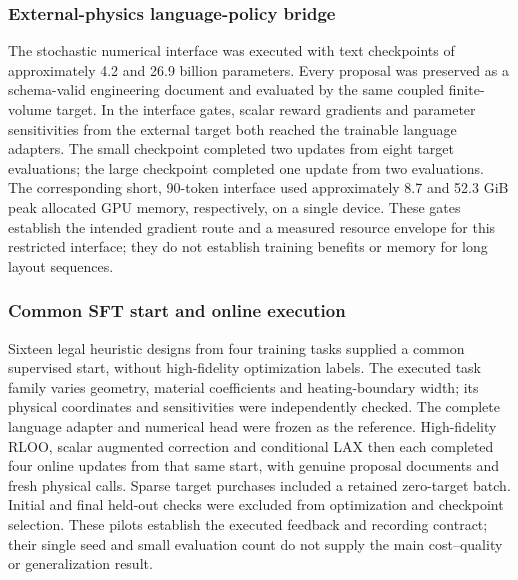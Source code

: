 \subsubsection{External-physics language-policy bridge}
The stochastic numerical interface was executed with text checkpoints of approximately 4.2 and 26.9 billion parameters. Every proposal was preserved as a schema-valid engineering document and evaluated by the same coupled finite-volume target. In the interface gates, scalar reward gradients and parameter sensitivities from the external target both reached the trainable language adapters. The small checkpoint completed two updates from eight target evaluations; the large checkpoint completed one update from two evaluations. The corresponding short, 90-token interface used approximately 8.7 and 52.3 GiB peak allocated GPU memory, respectively, on a single device. These gates establish the intended gradient route and a measured resource envelope for this restricted interface; they do not establish training benefits or memory for long layout sequences.

\subsubsection{Common SFT start and online execution}
Sixteen legal heuristic designs from four training tasks supplied a common supervised start, without high-fidelity optimization labels. The executed task family varies geometry, material coefficients and heating-boundary width; its physical coordinates and sensitivities were independently checked. The complete language adapter and numerical head were frozen as the reference. High-fidelity RLOO, scalar augmented correction and conditional LAX then each completed four online updates from that same start, with genuine proposal documents and fresh physical calls. Sparse target purchases included a retained zero-target batch. Initial and final held-out checks were excluded from optimization and checkpoint selection. These pilots establish the executed feedback and recording contract; their single seed and small evaluation count do not supply the main cost--quality or generalization result.

